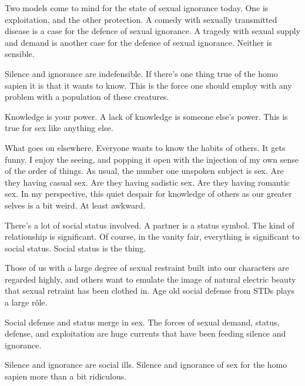 

Two models come to mind for the state of sexual ignorance today.  One
is exploitation, and the other protection.  A comedy with sexually
transmitted disease is a case for the defence of sexual ignorance.  A
tragedy with sexual supply and demand is another case for the defence
of sexual ignorance.  Neither is sensible.  

Silence and ignorance are indefensible.  If there's one thing true of
the homo sapien it is that it wants to know.  This is the force one
should employ with any problem with a population of these creatures.

Knowledge is your power.  A lack of knowledge is someone else's power.
This is true for sex like anything else.

What goes on elsewhere.  Everyone wants to know the habits of others.
It gets funny.  I enjoy the seeing, and popping it open with the
injection of my own sense of the order of things.  As usual, the
number one unspoken subject is sex.  Are they having casual sex.  Are
they having sadistic sex.  Are they having romantic sex.  In my
perspective, this quiet despair for knowledge of others as our greater
selves is a bit weird.  At least awkward.  

There's a lot of social status involved.  A partner is a status
symbol.  The kind of relationship is significant.  Of course, in the
vanity fair, everything is significant to social status.  Social
status is the thing.  

Those of us with a large degree of sexual restraint built into our
characters are regarded highly, and others want to emulate the image
of natural electric beauty that sexual retraint has been clothed in.
Age old social defense from STDs plays a large r\^ole.  

Social defense and status merge in sex.  The forces of sexual demand,
status, defense, and exploitation are huge currents that have been
feeding silence and ignorance.  

Silence and ignorance are social ills.  Silence and ignorance of sex
for the homo sapien more than a bit ridiculous.

\bye
